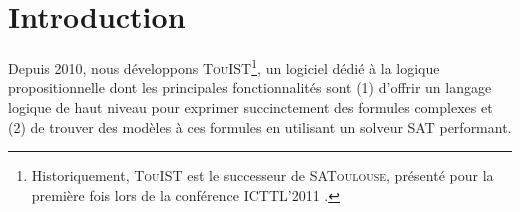 \documentclass{iaf}
\newcommand{\touist}{\textsc{TouIST}\xspace}
\newcommand{\satoulouse}{\textsc{SAToulouse}\xspace}
\begin{document}
\creationEntete




\section{Introduction}

Depuis 2010, nous développons \touist\footnote{Historiquement, \touist est le successeur de \satoulouse, présenté pour la première fois lors de la conférence ICTTL'2011 \cite{GaScSt2011}.}, un logiciel dédié à la logique propositionnelle dont les principales fonctionnalités sont (1) d'offrir un langage logique de haut niveau pour exprimer succinctement des formules complexes et (2) de trouver des modèles à ces formules en utilisant un solveur SAT performant. 
\end{document}
